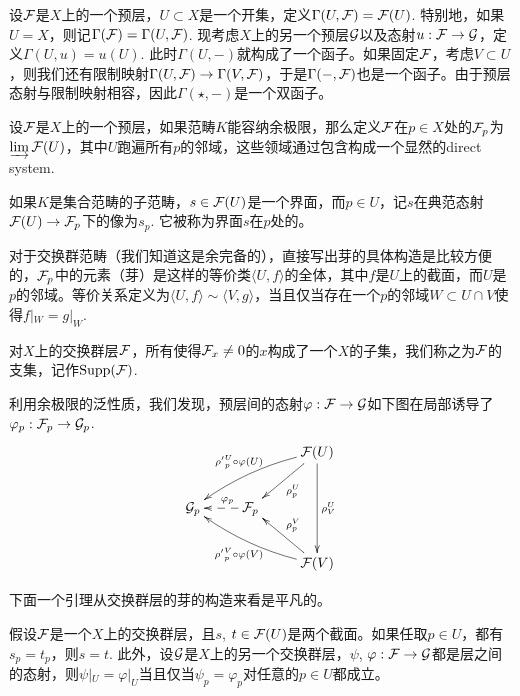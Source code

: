 \begin{para}[截面函子]
设$\mathcal{F}$是$X$上的一个预层，$U\subset X$是一个开集，定义$\Gamma(U,\mathcal{F})=\mathcal{F}(U)$. 特别地，如果$U=X$，则记$\Gamma(\mathcal{F})=\Gamma(U,\mathcal{F})$. 现考虑$X$上的另一个预层$\mathcal{G}$以及态射$u:\mathcal{F}\to\mathcal{G}$，定义$\Gamma(U,u)=u(U)$. 此时$\Gamma(U,-)$就构成了一个函子。如果固定$\mathcal{F}$，考虑$V\subset U$，则我们还有限制映射$\Gamma(U,\mathcal{F})\to\Gamma(V,\mathcal{F})$，于是$\Gamma(-,\mathcal{F})$也是一个函子。由于预层态射与限制映射相容，因此$\Gamma(\star,-)$是一个双函子。
\end{para}

\begin{para}[茎]
设$\mathcal{F}$是$X$上的一个预层，如果范畴$K$能容纳余极限，那么定义$\mathcal{F}$在$p\in X$处的$\mathcal{F}_p$为$\varinjlim \mathcal{F}(U)$，其中$U$跑遍所有$p$的邻域，这些领域通过包含构成一个显然的direct system. 

如果$K$是集合范畴的子范畴，$s\in \mathcal{F}(U)$是一个界面，而$p\in U$，记$s$在典范态射$\mathcal{F}(U)\to \mathcal{F}_p$下的像为$s_p$. 它被称为界面$s$在$p$处的。

对于交换群范畴（我们知道这是余完备的），直接写出芽的具体构造是比较方便的，$\mathcal{F}_p$中的元素（芽）是这样的等价类$\langle U,f\rangle$的全体，其中$f$是$U$上的截面，而$U$是$p$的邻域。等价关系定义为$\langle U,f\rangle\sim \langle V,g\rangle$，当且仅当存在一个$p$的邻域$W\subset U\cap V$使得$f|_W=g|_W$. 

对$X$上的交换群层$\mathcal{F}$，所有使得$\mathcal{F}_x\neq 0$的$x$构成了一个$X$的子集，我们称之为$\mathcal{F}$的支集，记作$\mathrm{Supp}(\mathcal{F})$.
\end{para}

利用余极限的泛性质，我们发现，预层间的态射$\varphi:\mathcal{F}\to\mathcal{G}$如下图在局部诱导了$\varphi_p:\mathcal{F}_p\to\mathcal{G}_p$.
\[
	\xymatrix{
		&&\calf(U)\ar[dl]^{\rho^U_{p}}\ar[dd]^{\rho^U_{V}}\ar@/_/[lld]_{{\rho'}^U_{p}\circ\varphi(U)} \\
		\calg_p&\calf_p\ar@{-->}[l]_(0.4){\varphi_p}&\\
		&&\calf(V)\ar[ul]_{\rho^V_{p}}\ar@/^/[llu]^{{\rho'}^V_{p}\circ\varphi(V)}
	}
\]

下面一个引理从交换群层的芽的构造来看是平凡的。

\begin{lem}\label{lem:1}
假设$\mathcal{F}$是一个$X$上的交换群层，且$s$, $t\in \mathcal{F}(U)$是两个截面。如果任取$p\in U$，都有$s_p=t_p$，则$s=t$. 此外，设$\mathcal{G}$是$X$上的另一个交换群层，$\psi$, $\varphi:\mathcal{F}\to\mathcal{G}$都是层之间的态射，则$\psi|_U=\varphi|_U$当且仅当$\psi_p=\varphi_p$对任意的$p\in U$都成立。
\end{lem}

